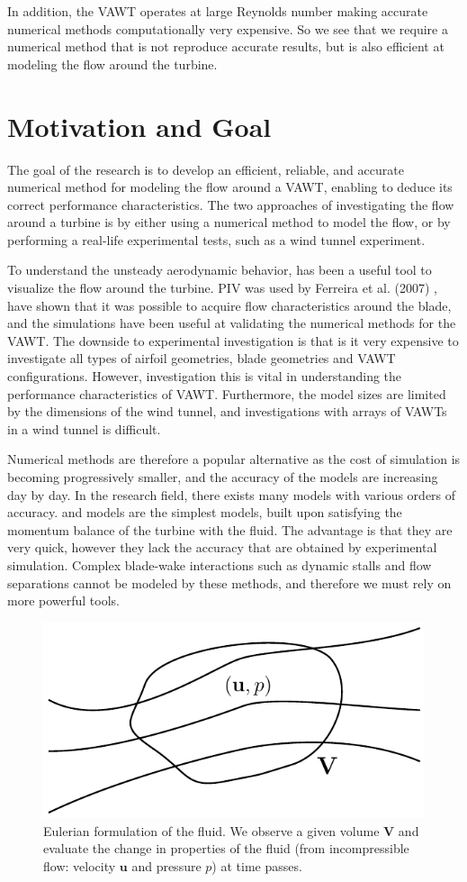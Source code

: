 In addition, the VAWT operates at large Reynolds number making accurate numerical methods computationally very expensive. So we see that we require a numerical method that is not reproduce accurate results, but is also efficient at modeling the flow around the turbine.

\section{Motivation and Goal}
The goal of the research is to develop an efficient, reliable, and accurate numerical method for modeling the flow around a  VAWT, enabling to deduce its correct performance characteristics. The two approaches of investigating the flow around a turbine is by either using a numerical method to model the flow, or by performing a real-life experimental tests, such as a wind tunnel experiment.

To understand the unsteady aerodynamic behavior,  has been a useful tool to visualize the flow around the turbine. PIV was used by Ferreira et al. (2007) \cite{Ferreira2007}, have shown that it was possible to acquire flow characteristics around the blade, and the simulations have been useful at validating the numerical methods for the VAWT. The downside to experimental investigation is that is it very expensive to investigate all types of airfoil geometries, blade geometries and VAWT configurations. However, investigation this is vital in understanding the performance characteristics of VAWT. Furthermore, the model sizes are limited by the dimensions of the wind tunnel, and investigations with arrays of VAWTs in a wind tunnel is difficult.

Numerical methods are therefore a popular alternative as the cost of simulation is becoming progressively smaller, and the accuracy of the models are increasing day by day. In the research field, there exists many models with various orders of accuracy.  and  models are the simplest models, built upon satisfying the momentum balance of the turbine with the fluid. The advantage is that they are very quick, however they lack the accuracy that are obtained by experimental simulation. Complex blade-wake interactions such as dynamic stalls and flow separations cannot be modeled by these methods, and therefore we must rely on more powerful tools.

	\begin{figure}[!t]
		\centering
		\includegraphics[width=0.4\linewidth]{figures/introduction/eulerianRF.pdf}
		\caption{Eulerian formulation of the fluid. We observe a given volume $\mathbf{V}$ and evaluate the change in properties of the fluid (from incompressible flow: velocity $\mathbf{u}$ and pressure $p$) at time passes.}
		\label{fig:eulerianRF}
	\end{figure}

